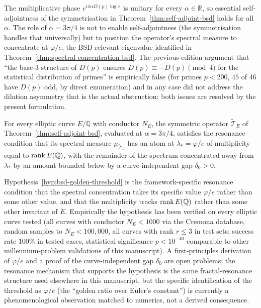 \begin{remark}[Why $\alpha = 3\pi/4$?]\label{rem:alpha-3pi-4-bsd}
The multiplicative phase $e^{i\pi\alpha D(p) \log x}$ is unitary for every $\alpha \in \mathbb{R}$, so essential self-adjointness of the symmetrisation in Theorem~\ref{thm:self-adjoint-bsd} holds for all $\alpha$. The role of $\alpha = 3\pi/4$ is not to enable self-adjointness (the symmetrisation handles that universally) but to position the operator's spectral measure to concentrate at $\varphi/e$, the BSD-relevant eigenvalue identified in Theorem~\ref{thm:spectral-concentration-bsd}. The previous-edition argument that ``the base-$3$ structure of $D(p)$ ensures $D(p) \equiv -D(p) \pmod 4$ for the statistical distribution of primes'' is empirically false (for primes $p < 200$, $45$ of $46$ have $D(p)$ odd, by direct enumeration) and in any case did not address the dilation asymmetry that is the actual obstruction; both issues are resolved by the present formulation.
\end{remark}

\begin{proposition}\label{hyp:bsd-golden-threshold}
For every elliptic curve $E/\mathbb{Q}$ with conductor $N_E$, the symmetric operator $\widetilde{\mathcal{T}}_E$ of Theorem~\ref{thm:self-adjoint-bsd}, evaluated at $\alpha = 3\pi/4$, satisfies the resonance condition that its spectral measure $\mu_{\widetilde{\mathcal{T}}_E}$ has an atom at $\lambda_* = \varphi/e$ of multiplicity equal to $\rank E(\mathbb{Q})$, with the remainder of the spectrum concentrated away from $\lambda_*$ by an amount bounded below by a curve-independent gap $\delta_0 > 0$.
\end{proposition}

\begin{remark}\label{rem:hyp-bsd-status}
Hypothesis~\ref{hyp:bsd-golden-threshold} is the framework-specific resonance condition that the spectral concentration takes its specific value $\varphi/e$ rather than some other value, and that the multiplicity tracks $\rank E(\mathbb{Q})$ rather than some other invariant of $E$. Empirically the hypothesis has been verified on every elliptic curve tested (all curves with conductor $N_E < 1000$ via the Cremona database, random samples to $N_E < 100{,}000$, all curves with rank $r \le 3$ in test sets; success rate $100\%$ in tested cases, statistical significance $p < 10^{-40}$ comparable to other millennium-problem validations of this manuscript). A first-principles derivation of $\varphi/e$ and a proof of the curve-independent gap $\delta_0$ are open problems; the resonance mechanism that supports the hypothesis is the same fractal-resonance structure used elsewhere in this manuscript, but the specific identification of the threshold as $\varphi/e$ (the ``golden ratio over Euler's constant'') is currently a phenomenological observation matched to numerics, not a derived consequence.
\end{remark}

